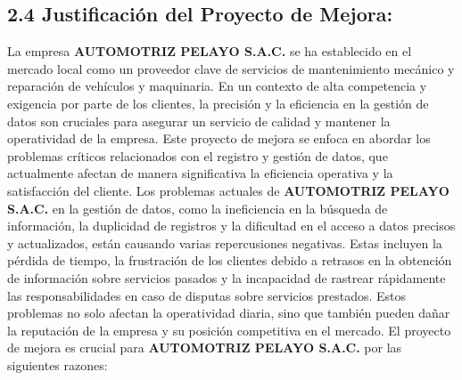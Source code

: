 \subsection{2.4 Justificación del Proyecto de Mejora: }
La empresa \textbf{AUTOMOTRIZ PELAYO S.A.C.} se ha establecido en el mercado local como un proveedor clave de servicios de mantenimiento mecánico y reparación de vehículos y maquinaria. En un contexto de alta competencia y exigencia por parte de los clientes, la precisión y la eficiencia en la gestión de datos son cruciales para asegurar un servicio de calidad y mantener la operatividad de la empresa. Este proyecto de mejora se enfoca en abordar los problemas críticos relacionados con el registro y gestión de datos, que actualmente afectan de manera significativa la eficiencia operativa y la satisfacción del cliente.
Los problemas actuales de \textbf{AUTOMOTRIZ PELAYO S.A.C.} en la gestión de datos, como la ineficiencia en la búsqueda de información, la duplicidad de registros y la dificultad en el acceso a datos precisos y actualizados, están causando varias repercusiones negativas. Estas incluyen la pérdida de tiempo, la frustración de los clientes debido a retrasos en la obtención de información sobre servicios pasados y la incapacidad de rastrear rápidamente las responsabilidades en caso de disputas sobre servicios prestados. Estos problemas no solo afectan la operatividad diaria, sino que también pueden dañar la reputación de la empresa y su posición competitiva en el mercado.
El proyecto de mejora es crucial para \textbf{AUTOMOTRIZ PELAYO S.A.C.} por las siguientes razones:
